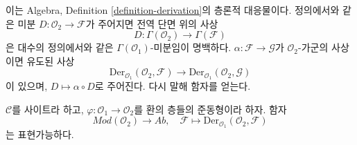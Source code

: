 \noindent
이는 Algebra, Definition \ref{definition-derivation}의 층론적 대응물이다.
정의에서와 같은 미분 $D : \mathcal{O}_2 \to \mathcal{F}$가 주어지면 전역
단면 위의 사상
$$
D : \Gamma(\mathcal{O}_2) \longrightarrow \Gamma(\mathcal{F})
$$
은 대수의 정의에서와 같은 $\Gamma(\mathcal{O}_1)$-미분임이 명백하다.
$\alpha : \mathcal{F} \to \mathcal{G}$가 $\mathcal{O}_2$-가군의 사상이면
유도된 사상
$$
\text{Der}_{\mathcal{O}_1}(\mathcal{O}_2, \mathcal{F})
\longrightarrow
\text{Der}_{\mathcal{O}_1}(\mathcal{O}_2, \mathcal{G})
$$
이 있으며, $D \mapsto \alpha \circ D$로 주어진다. 다시 말해 함자를 얻는다.

\begin{lemma}
\label{lemma-universal-module}
$\mathcal{C}$를 사이트라 하고, $\varphi : \mathcal{O}_1 \to \mathcal{O}_2$를
환의 층들의 준동형이라 하자. 함자
$$
\textit{Mod}(\mathcal{O}_2) \longrightarrow \textit{Ab}, \quad
\mathcal{F} \longmapsto \text{Der}_{\mathcal{O}_1}(\mathcal{O}_2, \mathcal{F})
$$
는 표현가능하다.
\end{lemma}

